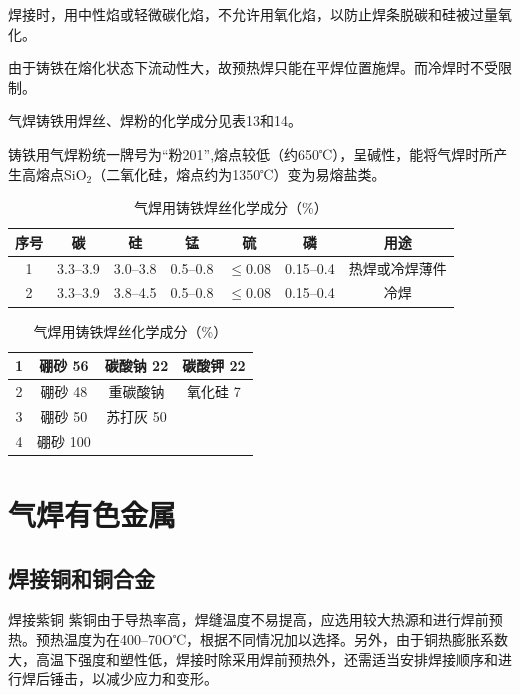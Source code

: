 \documentclass{ctexbook}
\begin{document}
焊接时，用中性焰或轻微碳化焰，不允许用氧化焰，以防止焊条脱碳和硅被过量氧化。

由于铸铁在熔化状态下流动性大，故预热焊只能在平焊位置施焊。而冷焊时不受限制。

气焊铸铁用焊丝、焊粉的化学成分见表13和14。

铸铁用气焊粉统一牌号为“粉201”,熔点较低（约650℃），呈碱性，能将气焊时所产生高熔点SiO$_2$（二氧化硅，熔点约为1350℃）变为易熔盐类。
\begin{table}[htbp]
	\centering
	\caption{气焊用铸铁焊丝化学成分（\%）}
	\begin{tabular}{c|c|c|c|c|c|c}
		\hline
	 序号&碳&硅&锰&硫&磷&用途 \\ \hline
		1&3.3--3.9&3.0--3.8&0.5--0.8&$\leqslant0.08$&0.15--0.4&热焊或冷焊薄件\\ \hline
		2&3.3--3.9&3.8--4.5&0.5--0.8&$\leqslant$0.08&0.15--0.4&冷焊		  \\ \hline
	\end{tabular}%
	\label{tab:qihanzhutie}%
\end{table}%



\begin{table}[htbp]
	\centering
	\caption{气焊用铸铁焊丝化学成分（\%）}
	\begin{tabular}{c|c|c|c}
		\hline
	1&硼砂 56& 碳酸钠 22& 碳酸钾 22\\ \hline
	2&硼砂 48&重碳酸钠\footnotemark 45&氧化硅 7\\ \hline
	3&硼砂 50&苏打灰 50 \footnotemark&\\ \hline
	4&硼砂 100&&\\ \hline
	\end{tabular}%
	\label{tab:qihanfen}%
\end{table}%
\section{气焊有色金属}
\subsection{焊接铜和铜合金}
焊接紫铜
紫铜由于导热率高，焊缝温度不易提高，应选用较大热源和进行焊前预热。预热温度为在400--70O℃，根据不同情况加以选择。另外，由于铜热膨胀系数大，高温下强度和塑性低，焊接时除采用焊前预热外，还需适当安排焊接顺序和进行焊后锤击，以减少应力和变形。
\end{document}

